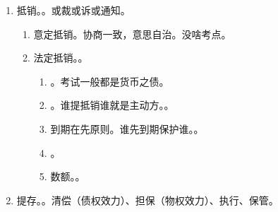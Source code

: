 \begin{enumerate}
\begin{enumerate}
\begin{enumerate}
                \end{enumerate}
          \item 行权法定。简单形成权。或诉或裁或[通知 \yjt 对方异议权 \yjt 任意一方提起确认之诉]。
          \item 期限。可约定。
          \item {}。3 个不影响。
                \begin{enumerate}
                  \item {}。本来就有效，只是合同目的无法实现，导致。
                  \item {}。
                  \item {}。
                \end{enumerate}
          \item 已经履行的，恢复原状 \hz 采取其他补救措施，并有权请求赔偿损失。
          \item {}。
          \item vs 撤销权。（典型的）形成权。
        \end{enumerate}
  \item 抵销。。或裁或诉或通知。
        \begin{enumerate}
          \item 意定抵销。协商一致，意思自治。没啥考点。
          \item 法定抵销。。
                \begin{enumerate}
                  \item {}。考试一般都是货币之债。
                  \item {}。谁提抵销谁就是主动方。。
                  \item 到期在先原则。谁先到期保护谁。。
                  \item {}。
                  \item 数额。。
                \end{enumerate}
        \end{enumerate}
  \item 提存。。清偿（债权效力）、担保（物权效力）、执行、保管。

\end{enumerate}
